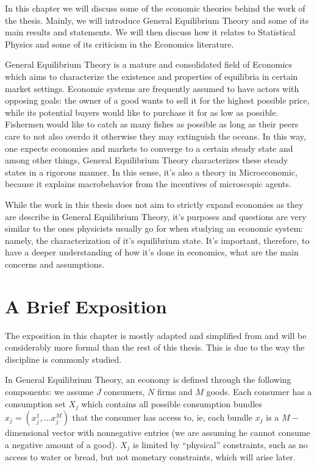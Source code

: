 In this chapter we will discuss some of the economic theories behind the work of the thesis. Mainly, we will introduce General Equilibrium
Theory and some of its main results and statements. We will then discuss how it relates to Statistical Physics and some of its
criticism in the Economics literature.

General Equilibrium Theory is a mature and consolidated field of Economics \cite{Arrow54, mascolell, mckenzie} which aims to
characterize the existence and properties of equilibria in certain market settings. Economic systems are frequently assumed to have
actors with opposing goals: the owner of a good wants to sell it for the highest possible price, while its potential buyers would like to
purchase it for as low as possible. Fishermen would like to catch as many fishes as possible as long as their peers care to not also overdo
it otherwise they may extinguish the oceans. In this way, one expects economies and markets to converge to a certain steady state and among
other things, General Equilibrium Theory characterizes these steady states in a rigorous manner. In this sense, it's also a theory in
Microeconomic, because it explains macrobehavior from the incentives of microscopic agents.

While the work in this thesis does not aim to strictly expand economies as they are describe in General Equilibrium Theory, it's
purposes and questions are very similar to the ones physicists usually go for when studying an economic system: namely, the characterization
of it's equilibrium state. It's important, therefore, to have a deeper understanding of how it's done in economics, what are the main
concerns and assumptions.

\section{A Brief Exposition}

The exposition in this chapter is mostly adapted and simplified from \cite{mascolell} and will be considerably more formal than the rest of
this thesis. This is due to the way the discipline is commonly studied.

In General Equilibrium Theory, an economy is defined through the following components: we assume $J$ consumers, $N$ firms and $M$
goods. Each consumer has a consumption set $X_j$ which contains all possible consumption bundles $x_j = (x_j^1, \ldots x_j^M)$ that the
consumer has access to, ie, each bundle $x_j$ is a $M-$dimensional vector with nonnegative entries (we are assuming he cannot consume a
negative amount of a good). $X_j$ is limited by ``physical'' constraints, such as no access to water or bread, but not monetary
constraints, which will arise later.

